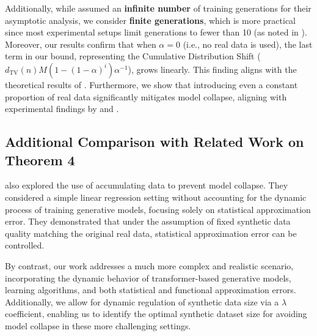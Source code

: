 Additionally, while \cite{marchi2024heat} assumed an \textbf{infinite number} of training generations for their asymptotic analysis, we consider \textbf{finite generations}, which is more practical since most experimental setups limit generations to fewer than 10 (as noted in \cite{shumailov2024ai}). Moreover, our results confirm that when \(\alpha = 0\) (i.e., no real data is used), the last term in our bound, representing the Cumulative Distribution Shift (\(d_{\text{TV}}(n) M (1 - (1 - \alpha)^i) \alpha^{-1}\)), grows linearly. This finding aligns with the theoretical results of \cite{dohmatob2024model,alemohammadself,shumailov2024ai,futowards}. Furthermore, we show that introducing even a constant proportion of real data significantly mitigates model collapse, aligning with experimental findings by \cite{alemohammadself} and \cite{bertrandstability}.



\subsection{Additional Comparison with Related Work on Theorem 4}

\cite{gerstgrasser2024is} also explored the use of accumulating data to prevent model collapse. They considered a simple linear regression setting without accounting for the dynamic process of training generative models, focusing solely on statistical approximation error. They demonstrated that under the assumption of fixed synthetic data quality matching the original real data, statistical approximation error can be controlled.  


 By contrast, our work addresses a much more complex and realistic scenario, incorporating the dynamic behavior of transformer-based generative models, learning algorithms, and both statistical and functional approximation errors. Additionally, we allow for dynamic regulation of synthetic data size via a \(\lambda\) coefficient, enabling us to identify the optimal synthetic dataset size for avoiding model collapse in these more challenging settings.




